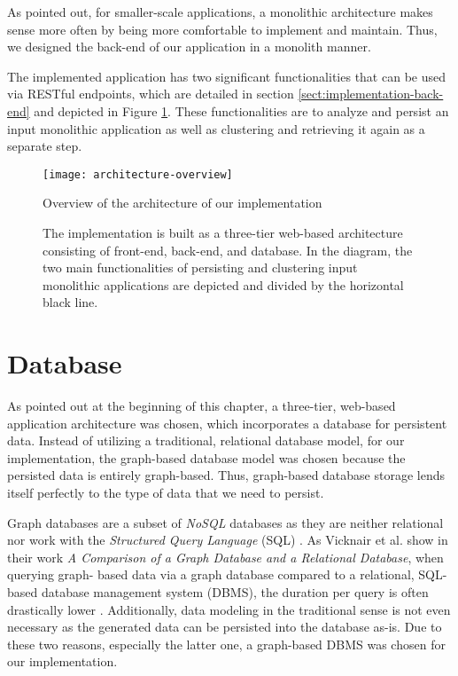 \documentclass[12pt,a4paper]{report}
\begin{document}
As pointed out, for smaller-scale applications, a monolithic architecture makes
sense more often by being more comfortable to implement and maintain. Thus, we
designed the back-end of our application in a monolith manner.

The implemented application has two significant functionalities that can be
used via RESTful endpoints, which are detailed in section
\ref{sect:implementation-back-end} and depicted in Figure \ref{fig:architecture-overview}.
These functionalities are to analyze and persist an input monolithic
application as well as clustering and retrieving it again as a separate step.

\begin{figure}[htbp]
\centering
\texttt{[image: architecture-overview]}
\caption{Overview of the architecture of our implementation}
\caption*{\centering
    The implementation is built as a three-tier web-based architecture consisting of
    front-end, back-end, and database. In the diagram, the two main functionalities of
    persisting and clustering input monolithic applications are depicted and
    divided by the horizontal black line.
}
\label{fig:architecture-overview}
\end{figure}



\section{Database} \label{sect:implementation-database}

As pointed out at the beginning of this chapter, a three-tier, web-based
application architecture was chosen, which incorporates a database for
persistent data. Instead of utilizing a traditional, relational database model,
for our implementation, the graph-based database model was chosen because the
persisted data is entirely graph-based. Thus, graph-based database storage
lends itself perfectly to the type of data that we need to persist.

Graph databases are a subset of \textit{NoSQL} databases as they are neither
relational nor work with the \textit{Structured Query Language} (SQL) \cite{
vicknair2010graphdatabase}. As Vicknair et al. show in their work
\textit{A Comparison of a Graph Database and a Relational Database}, when querying graph\hyp
based data via a graph database compared to a relational, SQL-based database
management system (DBMS), the duration per query is often drastically lower
\cite{vicknair2010graphdatabase}. Additionally, data modeling in the
traditional sense is not even necessary as the generated data can be persisted
into the database as-is. Due to these two reasons, especially the latter one,
a graph\hyp based DBMS was chosen for our implementation.
\end{document}
